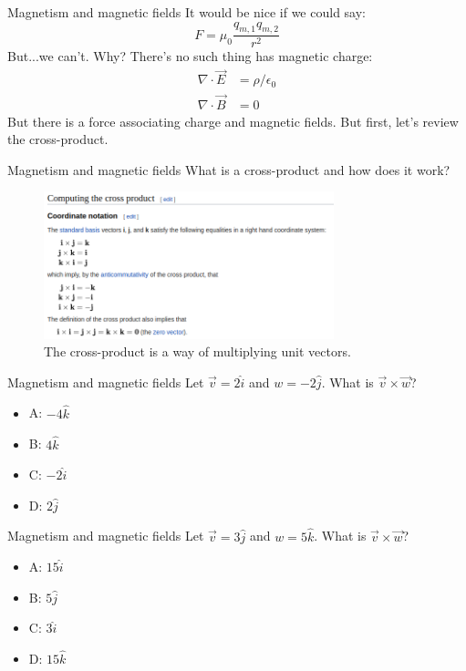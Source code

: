 \documentclass{beamer}
\begin{document}
\begin{frame}{Magnetism and magnetic fields}
It would be nice if we could say:
\begin{equation}
F = \mu_0 \frac{q_{m,1} q_{m,2}}{r^2}
\end{equation}
But...we can't.  Why?  There's no such thing has magnetic charge:
\begin{align}
\nabla \cdot \vec{E} &= \rho/\epsilon_0 \\ 
\nabla \cdot \vec{B} &= 0
\end{align}
But there is a force associating charge and magnetic fields.  But first, let's review the cross-product.
\end{frame}

\begin{frame}{Magnetism and magnetic fields}
What is a cross-product and how does it work? \\ \vspace{0.25cm}
\begin{figure}
\centering
\includegraphics[width=0.75\textwidth]{figures/crossP.png}
\caption{\label{fig:crossP} The cross-product is a way of multiplying unit vectors.}
\end{figure}
\end{frame}

\begin{frame}{Magnetism and magnetic fields}
Let $\vec{v} = 2\hat{i}$ and $w = -2 \hat{j}$.  What is $\vec{v} \times \vec{w}$?
\begin{itemize}
\item A: $-4 \hat{k}$
\item B: $4 \hat{k}$
\item C: $-2 \hat{i}$
\item D: $2 \hat{j}$
\end{itemize}
\end{frame}

\begin{frame}{Magnetism and magnetic fields}
Let $\vec{v} = 3\hat{j}$ and $w = 5 \hat{k}$.  What is $\vec{v} \times \vec{w}$?
\begin{itemize}
\item A: $15 \hat{i}$
\item B: $5 \hat{j}$
\item C: $3 \hat{i}$
\item D: $15 \hat{k}$
\end{itemize}
\end{frame}
\end{document}

